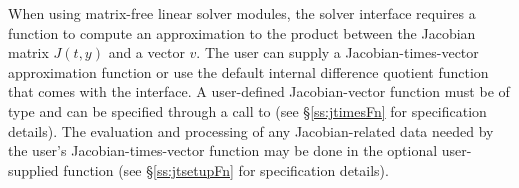 When using matrix-free linear solver modules, the {\cvls} solver
interface requires a function to compute an approximation to the
product between the Jacobian matrix $J(t,y)$ and a vector $v$. The
user can supply a Jacobian-times-vector approximation function or use
the default internal difference quotient function
that comes with the {\cvls} interface.  A user-defined Jacobian-vector
function must be of type  and
can be specified through a call to  (see
\S\ref{ss:jtimesFn} for specification details).
The evaluation and processing of any Jacobian-related data needed by
the user's Jacobian-times-vector function may be done in the optional
user-supplied function  (see \S\ref{ss:jtsetupFn} for
specification details).

